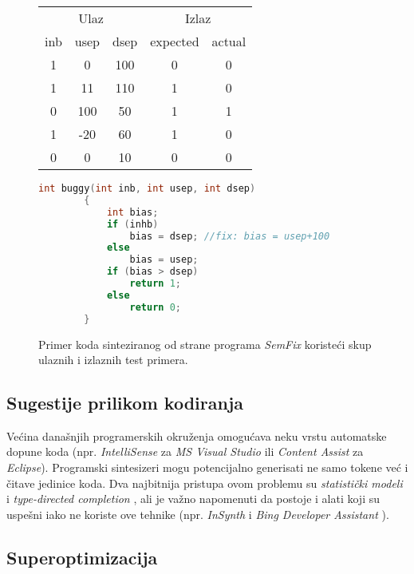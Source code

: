 \begin{figure}[t]
    \centering
    \begin{tabular}{ccc|cc}
        \multicolumn{3}{c|}{Ulaz} & \multicolumn{2}{c}{Izlaz}\\
        inb & usep & dsep & expected & actual \\
        \hline
        1 & 0 & 100 & 0 & 0 \\
        1 & 11 & 110 & 1 & 0 \\
        0 & 100 & 50 & 1 & 1 \\
        1 & -20 & 60 & 1 & 0 \\
        0 & 0 & 10 & 0 & 0 \\
    \end{tabular}

    \centering
    \begin{lstlisting}[language=C]
        int buggy(int inb, int usep, int dsep)
        {
            int bias;
            if (inhb)
                bias = dsep; //fix: bias = usep+100
            else
                bias = usep;
            if (bias > dsep)
                return 1;
            else
                return 0;
        }
    \end{lstlisting}

    \caption{Primer koda sinteziranog od strane programa \emph{SemFix} \cite{SemFix} koristeći skup ulaznih i izlaznih test primera.}
    \label{fig:CodeRepair}
\end{figure}

\subsection{Sugestije prilikom kodiranja}
\label{subsec:SugestijePrilikomKodiranja}

Većina današnjih programerskih okruženja omogućava neku vrstu automatske dopune koda (npr. \emph{IntelliSense} za \emph{MS Visual Studio} ili \emph{Content Assist} za \emph{Eclipse}). Programski sintesizeri mogu potencijalno generisati ne samo tokene već i čitave jedinice koda. Dva najbitnija pristupa ovom problemu su \emph{statistički modeli} \cite{CCWSLM} i \emph{type-directed completion} \cite{TDCOPE}, ali je važno napomenuti da postoje i alati koji su uspešni iako ne koriste ove tehnike (npr. \emph{InSynth} \cite{IS} i \emph{Bing Developer Assistant} \cite{BDA}).


\subsection{Superoptimizacija}
\label{subsec:Superoptimizacija}

